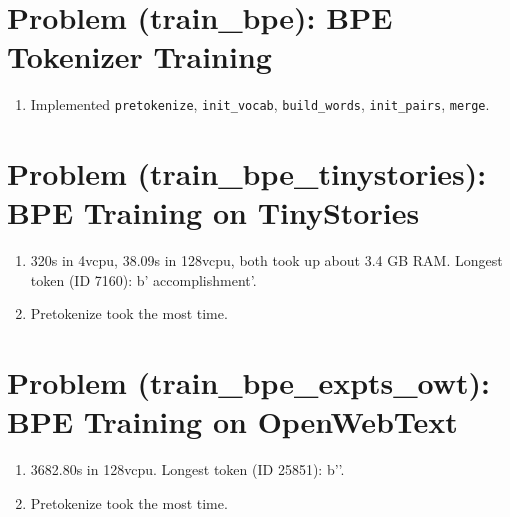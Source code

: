 \documentclass{article}
\begin{document}
\section*{Problem (train\_bpe): BPE Tokenizer Training}

\begin{enumerate}
    \item[] Implemented \texttt{pretokenize}, \texttt{init\_vocab}, \texttt{build\_words}, \texttt{init\_pairs}, \texttt{merge}.
\end{enumerate}

\section*{Problem (train\_bpe\_tinystories): BPE Training on TinyStories}

\begin{enumerate}
    \item[(a)] 320s in 4vcpu, 38.09s in 128vcpu, both took up about 3.4 GB RAM. Longest token (ID 7160): b' accomplishment'. 
    \item[(b)] Pretokenize took the most time.
\end{enumerate}

\section*{Problem (train\_bpe\_expts\_owt): BPE Training on OpenWebText}

\begin{enumerate}
    \item[(a)] 3682.80s in 128vcpu. Longest token (ID 25851): b''. 
    \item[(b)] Pretokenize took the most time.
\end{enumerate}
\end{document}
